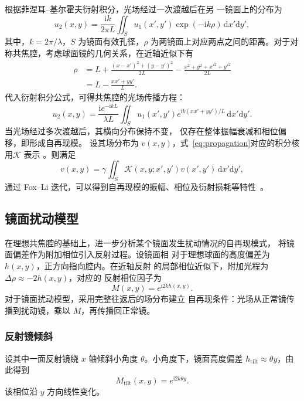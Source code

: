 \documentclass[UTF8,a4paper,12pt]{ctexart}
\begin{document}
根据菲涅耳--基尔霍夫衍射积分，光场经过一次渡越后在另
一镜面上的分布为~\cite{xia2016laser,fox1961resonant}
\begin{equation}
 u_2(x,y)=\frac{\mathrm{i}k}{2\pi L}\iint_S u_1(x',y')\exp(-\mathrm{i}k\rho)\,\mathrm dx'\mathrm dy',
\end{equation}
其中，\(k=2\pi/\lambda\)，\(S\) 为镜面有效孔径，\(\rho\) 为两镜面上对应两点之间的距离。对于对称共焦腔，考虑球面镜的几何关系，在近轴近似下有
\begin{equation}
\begin{aligned}
 \rho&=L+\frac{(x-x')^2+(y-y')^2}{2L}
 -\frac{x^2+y^2+x'^2+y'^2}{2L}\\
 &=L-\frac{xx'+yy'}{L}.
\end{aligned}
\end{equation}
代入衍射积分公式，可得共焦腔的光场传播方程：
\begin{equation}\label{eq:propagation}
 u_2(x,y)=\frac{\mathrm{i}e^{-\mathrm{i}kL}}{\lambda L}
 \iint_S u_1(x',y')e^{\mathrm{i}k(xx'+yy')/L}\,\mathrm dx'\mathrm dy'.
\end{equation}
当光场经过多次渡越后，其横向分布保持不变，
仅存在整体振幅衰减和相位偏移，即形成自再现模。
设其场分布为 \(v(x,y)\)，式~\eqref{eq:propagation}对应的积分核用\(\mathcal K\) 表示
。则满足
\begin{equation}
 v(x,y)=\gamma\iint_S\mathcal K(x,y;x',y')v(x',y')\,\mathrm dx'\mathrm dy',
\end{equation}
通过 Fox--Li 迭代，可以得到自再现模的振幅、相位及衍射损耗等特性~\cite{fox1961resonant}。

\subsection{镜面扰动模型}
在理想共焦腔的基础上，进一步分析某个镜面发生扰动情况的自再现模式，
将镜面偏差作为附加相位引入反射过程。设镜面相
对于理想球面的高度偏差为 \(h(x,y)\)，正方向指向腔内。在近轴反射
的局部相位近似下，附加光程为 \(\Delta\rho\approx-2h(x,y)\)，对应的
反射相位因子为
\begin{equation}\label{eq:mirror-phase}
 M(x,y)=e^{\mathrm{i}2kh(x,y)}.
\end{equation}
对于镜面扰动模型，采用完整往返后的场分布建立
自再现条件：光场从正常镜传播到扰动镜，乘以 \(M\)，再传播回正常镜。

\subsubsection{反射镜倾斜}
设其中一面反射镜绕 \(x\) 轴倾斜小角度 \(\theta\)。小角度下，镜面高度偏差 \(h_{\mathrm{tilt}}\approx\theta y\)，由此得到
\begin{equation}
 M_{\mathrm{tilt}}(x,y)=e^{\mathrm{i}2k\theta y}.
\end{equation}
该相位沿 \(y\) 方向线性变化。
\end{document}
